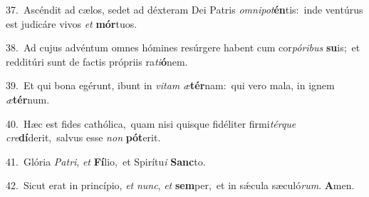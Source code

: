 {\numbfont\textcolor{\numbcolor}{37.}}~Ascéndit ad cælos, sedet ad déxteram Dei Patris \textit{om}\-\textit{ni}\textit{pot}\textbf{én}tis:~\star inde ventúrus est judicáre vivos \textit{et} \textbf{mór}\-tuos.\par
{\numbfont\textcolor{\numbcolor}{38.}}~Ad cujus advéntum omnes hómines resúrgere habent cum cor\-\textit{pó}\-\textit{ri}\textit{bus} \textbf{su}\-is;~\star et redditúri sunt de factis própriis ra\-\textit{ti}\-\textbf{ó}nem.\par
{\numbfont\textcolor{\numbcolor}{39.}}~Et qui bona egérunt, ibunt in \textit{vi}\-\textit{tam} \textit{æ}\-\textbf{tér}nam:~\star qui vero mala, in ignem \textit{æ}\-\textbf{tér}num.\par
{\numbfont\textcolor{\numbcolor}{40.}}~Hæc est fides cathólica,~\dagger quam nisi quisque fidéliter firmi\-\textit{tér}\-\textit{que} \textit{cre}\-\textbf{dí}derit,~\star salvus esse \textit{non} \textbf{pót}\-erit.\par
{\numbfont\textcolor{\numbcolor}{41.}}~Glória \textit{Pa}\-\textit{tri}, \textit{et} \textbf{Fí}\-lio,~\star et Spirítu\textit{i} \textbf{Sanc}\-to.\par
{\numbfont\textcolor{\numbcolor}{42.}}~Sicut erat in princípio, \textit{et} \textit{nunc}\-, \textit{et} \textbf{sem}\-per,~\star et in sǽcula sæculó\-\textit{rum}\-. \textbf{A}\-men.\par
